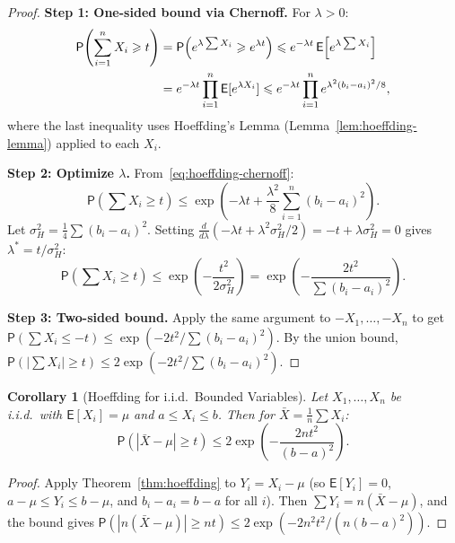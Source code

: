 \documentclass[14pt]{extarticle}
\theoremstyle{plain}
\newtheorem{corollary}[theorem]{Corollary}
\theoremstyle{definition}
\theoremstyle{remark}
\newcommand\expc{\mathsf{E}}
\newcommand\prb{\mathsf{P}}
\begin{document}
\begin{proof}
\textbf{Step 1: One-sided bound via Chernoff.} For $\lambda > 0$:
\begin{align}
\prb\!\left(\sum_{i=1}^n X_i \geqslant t\right) &= \prb\!\left(e^{\lambda\sum X_i} \geqslant e^{\lambda t}\right) \leqslant e^{-\lambda t}\,\expc\!\left[e^{\lambda\sum X_i}\right] \notag\\
&= e^{-\lambda t}\prod_{i=1}^n \expc[e^{\lambda X_i}] \leqslant e^{-\lambda t}\prod_{i=1}^n e^{\lambda^2(b_i - a_i)^2/8}, \label{eq:hoeffding-chernoff}
\end{align}
where the last inequality uses Hoeffding's Lemma (Lemma~\ref{lem:hoeffding-lemma}) applied to each $X_i$.

\textbf{Step 2: Optimize $\lambda$.} From~\eqref{eq:hoeffding-chernoff}:
\[
\prb\!\left(\sum X_i \geqslant t\right) \leqslant \exp\!\left(-\lambda t + \frac{\lambda^2}{8}\sum_{i=1}^n(b_i - a_i)^2\right).
\]
Let $\sigma_H^2 = \frac{1}{4}\sum(b_i - a_i)^2$. Setting $\frac{d}{d\lambda}(-\lambda t + \lambda^2\sigma_H^2/2) = -t + \lambda\sigma_H^2 = 0$ gives $\lambda^* = t/\sigma_H^2$:
\[
\prb\!\left(\sum X_i \geqslant t\right) \leqslant \exp\!\left(-\frac{t^2}{2\sigma_H^2}\right) = \exp\!\left(-\frac{2t^2}{\sum(b_i-a_i)^2}\right).
\]

\textbf{Step 3: Two-sided bound.} Apply the same argument to $-X_1, \ldots, -X_n$ to get $\prb(\sum X_i \leqslant -t) \leqslant \exp(-2t^2/\sum(b_i-a_i)^2)$. By the union bound, $\prb(|\sum X_i| \geqslant t) \leqslant 2\exp(-2t^2/\sum(b_i-a_i)^2)$.
\end{proof}

\begin{corollary}[Hoeffding for i.i.d.\ Bounded Variables]\label{cor:hoeffding-iid}
Let $X_1, \ldots, X_n$ be i.i.d.\ with $\expc[X_i] = \mu$ and $a \leqslant X_i \leqslant b$. Then for $\bar{X} = \frac{1}{n}\sum X_i$:
\begin{equation}\label{eq:hoeffding-mean}
\prb\!\left(|\bar{X} - \mu| \geqslant t\right) \leqslant 2\exp\!\left(-\frac{2nt^2}{(b-a)^2}\right).
\end{equation}
\end{corollary}

\begin{proof}
Apply Theorem~\ref{thm:hoeffding} to $Y_i = X_i - \mu$ (so $\expc[Y_i] = 0$, $a - \mu \leqslant Y_i \leqslant b - \mu$, and $b_i - a_i = b - a$ for all $i$). Then $\sum Y_i = n(\bar{X} - \mu)$, and the bound gives $\prb(|n(\bar{X}-\mu)| \geqslant nt) \leqslant 2\exp(-2n^2t^2/(n(b-a)^2))$.
\end{proof}
\end{document}
